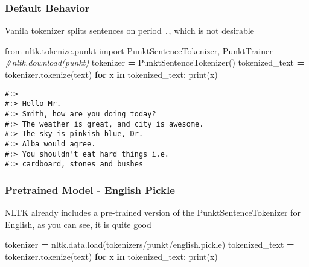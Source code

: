 \documentclass[
]{book}
\newenvironment{Shaded}{\begin{snugshade}}{\end{snugshade}}
\newcommand{\BuiltInTok}[1]{#1}
\newcommand{\CommentTok}[1]{\textcolor[rgb]{0.37,0.37,0.37}{\textit{#1}}}
\newcommand{\ControlFlowTok}[1]{\textcolor[rgb]{0.27,0.27,0.27}{\textbf{#1}}}
\newcommand{\ImportTok}[1]{#1}
\newcommand{\KeywordTok}[1]{\textcolor[rgb]{0.27,0.27,0.27}{\textbf{#1}}}
\newcommand{\NormalTok}[1]{#1}
\newcommand{\OperatorTok}[1]{\textcolor[rgb]{0.43,0.43,0.43}{\textbf{#1}}}
\newcommand{\StringTok}[1]{\textcolor[rgb]{0.5,0.5,0.5}{#1}}
\begin{document}
\hypertarget{default-behavior}{%
\subsubsection{Default Behavior}\label{default-behavior}}

Vanila tokenizer splits sentences on period \texttt{.}, which is not desirable

\begin{Shaded}
\begin{Highlighting}[]
\ImportTok{from}\NormalTok{ nltk.tokenize.punkt }\ImportTok{import}\NormalTok{ PunktSentenceTokenizer, PunktTrainer}
\CommentTok{\#nltk.download(\textquotesingle{}punkt\textquotesingle{})}
\NormalTok{tokenizer }\OperatorTok{=}\NormalTok{ PunktSentenceTokenizer()}
\NormalTok{tokenized\_text }\OperatorTok{=}\NormalTok{ tokenizer.tokenize(text) }
\ControlFlowTok{for}\NormalTok{ x }\KeywordTok{in}\NormalTok{ tokenized\_text:}
  \BuiltInTok{print}\NormalTok{(x) }
\end{Highlighting}
\end{Shaded}

\begin{verbatim}
#:> 
#:> Hello Mr.
#:> Smith, how are you doing today?
#:> The weather is great, and city is awesome.
#:> The sky is pinkish-blue, Dr.
#:> Alba would agree.
#:> You shouldn't eat hard things i.e.
#:> cardboard, stones and bushes
\end{verbatim}

\hypertarget{pretrained-model---english-pickle}{%
\subsubsection{Pretrained Model - English Pickle}\label{pretrained-model---english-pickle}}

NLTK already includes a pre-trained version of the PunktSentenceTokenizer for English, as you can see, it is quite good

\begin{Shaded}
\begin{Highlighting}[]
\NormalTok{tokenizer      }\OperatorTok{=}\NormalTok{ nltk.data.load(}\StringTok{\textquotesingle{}tokenizers/punkt/english.pickle\textquotesingle{}}\NormalTok{)}
\NormalTok{tokenized\_text }\OperatorTok{=}\NormalTok{ tokenizer.tokenize(text) }
\ControlFlowTok{for}\NormalTok{ x }\KeywordTok{in}\NormalTok{ tokenized\_text:}
  \BuiltInTok{print}\NormalTok{(x) }
\end{Highlighting}
\end{Shaded}
\end{document}
